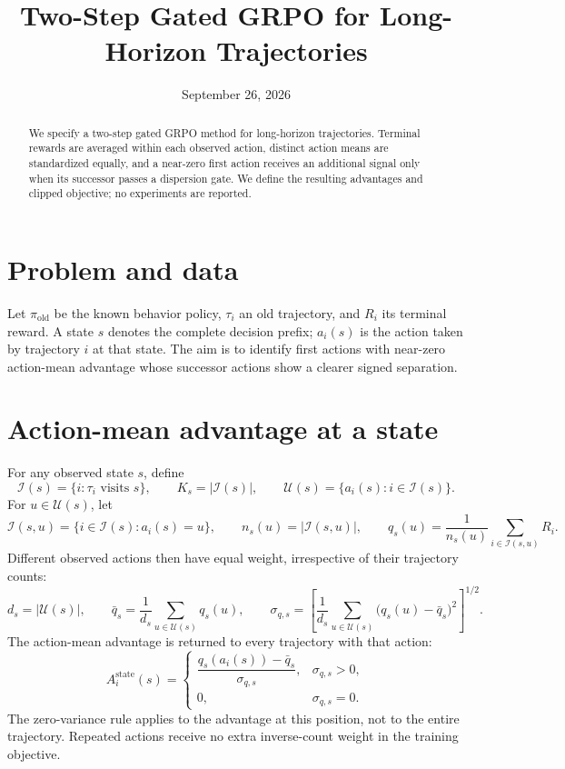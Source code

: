 \documentclass[10pt]{article}
\title{Two-Step Gated GRPO for Long-Horizon Trajectories}
\author{\vspace{-2em}}
\date{September 26, 2026}
\begin{document}
\maketitle

\begin{abstract}
We specify a two-step gated GRPO method for long-horizon trajectories.
Terminal rewards are averaged within each observed action, distinct action
means are standardized equally, and a near-zero first action receives an
additional signal only when its successor passes a dispersion gate. We define
the resulting advantages and clipped objective; no experiments are reported.
\end{abstract}

\section{Problem and data}

Let \(\pi_{\mathrm{old}}\) be the known behavior policy, \(\tau_i\) an old
trajectory, and \(R_i\) its terminal reward. A state \(s\) denotes the
complete decision prefix; \(a_i(s)\) is the action taken by trajectory \(i\)
at that state. The aim is to identify first actions with near-zero
action-mean advantage whose successor actions show a clearer signed
separation.

\section{Action-mean advantage at a state}

For any observed state \(s\), define
\begin{equation}
\mathcal I(s)=\{i:\tau_i\text{ visits }s\},\qquad
K_s=|\mathcal I(s)|,\qquad
\mathcal U(s)=\{a_i(s):i\in\mathcal I(s)\}.
\end{equation}
For \(u\in\mathcal U(s)\), let
\begin{equation}
\mathcal I(s,u)=\{i\in\mathcal I(s):a_i(s)=u\},\qquad
n_s(u)=|\mathcal I(s,u)|,\qquad
q_s(u)=\frac{1}{n_s(u)}\sum_{i\in\mathcal I(s,u)}R_i.
\end{equation}
Different observed actions then have equal weight, irrespective of their
trajectory counts:
\begin{equation}
d_s=|\mathcal U(s)|,\qquad
\bar q_s=\frac{1}{d_s}\sum_{u\in\mathcal U(s)}q_s(u),\qquad
\sigma_{q,s}=
\left[\frac{1}{d_s}\sum_{u\in\mathcal U(s)}
       \bigl(q_s(u)-\bar q_s\bigr)^2\right]^{1/2}.
\end{equation}
The action-mean advantage is returned to every trajectory with that action:
\begin{equation}
A_i^{\mathrm{state}}(s)=
\begin{cases}
\dfrac{q_s(a_i(s))-\bar q_s}{\sigma_{q,s}},
    &\sigma_{q,s}>0,\\[6pt]
0, &\sigma_{q,s}=0.
\end{cases}
\end{equation}
The zero-variance rule applies to the advantage at this position, not to
the entire trajectory. Repeated actions receive no extra inverse-count
weight in the training objective.
\end{document}

